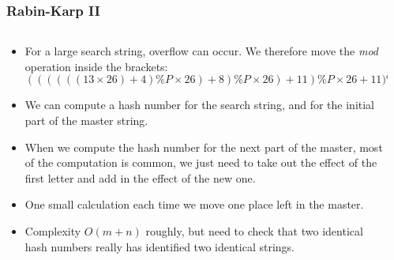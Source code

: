 \begin{frame}[fragile]
\frametitle{Rabin-Karp II}
\begin{columns}[T]

\begin{column}{0.530\textwidth}
\begin{itemize}[<+->]
\item For a large search string, overflow can occur. We therefore move the {\it mod} operation inside the brackets:
{\scriptsize
\[
((((((13\times26)+ 4)\%P \times26) + 8)\%P \times26) + 11)\%P \times26 + 11) \% P
\]
}
\item We can compute a hash number for the search string, and for the initial part of the master string.
\item When we compute the hash number for the next part of the master, most of the computation is common, we just need to take out the effect of the first letter and add in the effect of the new one.
\item One small calculation each time we move one place left in the master.
\item Complexity $O(m+n)$ roughly, but need to check that two identical hash numbers really has identified two identical strings.
\end{itemize}
\end{column}

\pause
\begin{column}{0.420\textwidth}

\end{column}

\end{columns}
\end{frame}


